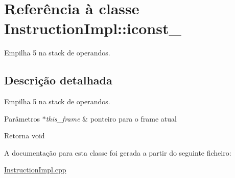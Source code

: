 \hypertarget{class_instruction_impl_1_1iconst__5}{}\section{Referência à classe Instruction\+Impl\+:\+:iconst\+\_}
\label{class_instruction_impl_1_1iconst__5}


Empilha 5 na stack de operandos.  




\subsection{Descrição detalhada}
Empilha 5 na stack de operandos. 


\begin{DoxyParams}{Parâmetros}
{\em $\ast$this\+\_\+frame} & ponteiro para o frame atual \\
\hline
\end{DoxyParams}
\begin{DoxyReturn}{Retorna}
void 
\end{DoxyReturn}


A documentação para esta classe foi gerada a partir do seguinte ficheiro\+:\begin{DoxyCompactItemize}
\item 
\hyperlink{_instruction_impl_8cpp}{Instruction\+Impl.\+cpp}\end{DoxyCompactItemize}
